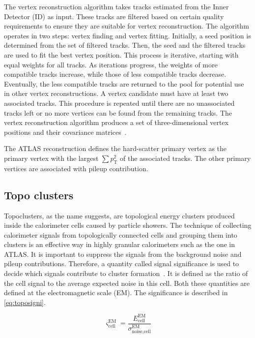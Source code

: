 The vertex reconstruction algorithm takes tracks estimated from the Inner Detector (ID) as input. These tracks are filtered based on certain quality requirements to ensure 
they are suitable for vertex reconstruction. The algorithm operates in two steps: vertex finding and vertex fitting. Initially, a seed position is determined from the set of 
filtered tracks. Then, the seed and the filtered tracks are used to fit the best vertex position. This process is iterative, starting with equal weights for all tracks. As iterations 
progress, the weights of more compatible tracks increase, while those of less compatible tracks decrease. Eventually, the less compatible tracks are returned to the pool for potential 
use in other vertex reconstructions. A vertex candidate must have at least two associated tracks. This procedure is repeated until there are no unassociated tracks left or no more 
vertices can be found from the remaining tracks. The vertex reconstruction algorithm produces a set of three-dimensional vertex positions and their covariance 
matrices~\cite{F_Meloni_vertex}.

The ATLAS reconstruction defines the hard-scatter primary vertex as the primary vertex with the
largest $\sum p_{\text{T}}^2$ of the associated tracks. The other primary vertices are associated
with pileup contribution. 

\subsection{Topo clusters}
Topoclusters, as the name suggests, are topological energy clusters produced inside the calorimeter 
cells caused by particle showers. The technique of collecting calorimeter signals from topologically 
connected cells and grouping them into clusters is an effective way in 
highly granular calorimeters such as the one in ATLAS. It is important to suppress the signals from the
background noise and pileup contributions. Therefore, a quantity called signal significance is used to
decide which signals contribute to cluster formation~\cite{Aad:2138166}. It is defined as the ratio of 
the cell signal to the average expected noise in this cell. Both these quantities are defined at the 
electromagnetic scale (EM). The significance is described in \cref{eq:toposigni}.

\begin{equation}
    \varsigma_{\text{cell}}^{\text{EM}} = \frac{E_{\text{cell}}^{\text{EM}}}{\sigma_{\text{noise,cell}}^{\text{EM}}}
    \label{eq:toposigni}
\end{equation}

